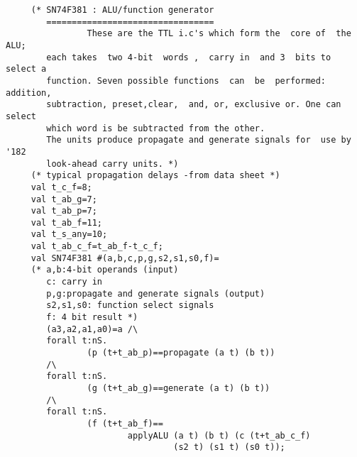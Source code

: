\begin{verbatim}
     (* SN74F381 : ALU/function generator
        =================================
                These are the TTL i.c's which form the  core of  the ALU;
        each takes  two 4-bit  words ,  carry in  and 3  bits to select a
        function. Seven possible functions  can  be  performed: addition,
        subtraction, preset,clear,  and, or, exclusive or. One can select
        which word is be subtracted from the other.
        The units produce propagate and generate signals for  use by '182
        look-ahead carry units. *)
     (* typical propagation delays -from data sheet *)
     val t_c_f=8;
     val t_ab_g=7;
     val t_ab_p=7;
     val t_ab_f=11;
     val t_s_any=10;
     val t_ab_c_f=t_ab_f-t_c_f;
     val SN74F381 #(a,b,c,p,g,s2,s1,s0,f)=
     (* a,b:4-bit operands (input)
        c: carry in
        p,g:propagate and generate signals (output)
        s2,s1,s0: function select signals
        f: 4 bit result *)
        (a3,a2,a1,a0)=a /\
        forall t:nS.
                (p (t+t_ab_p)==propagate (a t) (b t))
        /\
        forall t:nS.
                (g (t+t_ab_g)==generate (a t) (b t))
        /\
        forall t:nS.
                (f (t+t_ab_f)==
                        applyALU (a t) (b t) (c (t+t_ab_c_f)
                                 (s2 t) (s1 t) (s0 t));

\end{verbatim}
